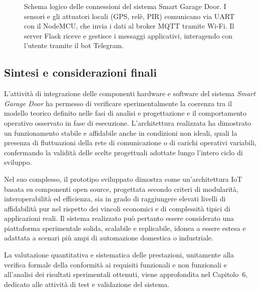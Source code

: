 \begin{figure}[h!]
\caption{Schema logico delle connessioni del sistema Smart Garage Door. I sensori e gli attuatori locali (GPS, relè, PIR) comunicano via UART con il NodeMCU, che invia i dati al broker MQTT tramite Wi-Fi. Il server Flask riceve e gestisce i messaggi applicativi, interagendo con l'utente tramite il bot Telegram.}
\label{fig:integration_schema}
\end{figure}




\subsection*{Sintesi e considerazioni finali}

L’attività di integrazione delle componenti hardware e software del sistema \textit{Smart Garage Door} ha permesso di verificare sperimentalmente la coerenza tra il modello teorico definito nelle fasi di analisi e progettazione e il comportamento operativo osservato in fase di esecuzione. L’architettura realizzata ha dimostrato un funzionamento stabile e affidabile anche in condizioni non ideali, quali la presenza di fluttuazioni della rete di comunicazione o di carichi operativi variabili, confermando la validità delle scelte progettuali adottate lungo l’intero ciclo di sviluppo.

Nel suo complesso, il prototipo sviluppato dimostra come un’architettura IoT basata su componenti open source, progettata secondo criteri di modularità, interoperabilità ed efficienza, sia in grado di raggiungere elevati livelli di affidabilità pur nel rispetto dei vincoli economici e di complessità tipici di applicazioni reali. Il sistema realizzato può pertanto essere considerato una piattaforma sperimentale solida, scalabile e replicabile, idonea a essere estesa e adattata a scenari più ampi di automazione domestica o industriale.

La valutazione quantitativa e sistematica delle prestazioni, unitamente alla verifica formale della conformità ai requisiti funzionali e non funzionali e all’analisi dei risultati sperimentali ottenuti, viene approfondita nel Capitolo~6, dedicato alle attività di test e validazione del sistema.
